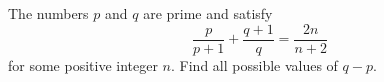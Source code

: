 The numbers $p$ and $q$ are prime and satisfy \[\frac{p}{p+1}+\frac{q+1}{q}=\frac{2n}{n+2}\] for some positive integer $n$. Find all possible values of $q-p$.